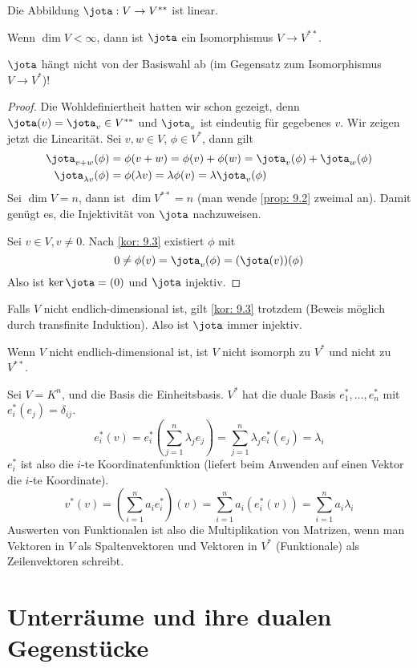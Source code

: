 \documentclass[a4paper, 10pt]{scrbook}
\begin{document}
\begin{thm}
\label{thm:9.5}
Die Abbildung $\jota: V\to V^{**}$ ist linear.

Wenn $\dim V<\infty$, dann ist $\jota$ ein Isomorphismus $V\to V^{**}$.
\begin{note}
	$\jota$ hängt nicht von der Basiswahl ab (im Gegensatz zum Isomorphismus $V\to V^*$)!
\end{note}
\begin{proof}
	Die Wohldefiniertheit hatten wir schon gezeigt, denn $\jota(v) = \jota_v \in V^{**}$ und $\jota_v$ ist eindeutig für gegebenes $v$.
	Wir zeigen jetzt die Linearität. 
	Sei $v,w\in V$, $\phi\in V^*$, dann gilt
\begin{align*}
\jota_{v+w}(\phi)&=\phi(v+w)=\phi(v)+\phi(w)=\jota_v(\phi)+\jota_w(\phi)\\
\jota_{\lambda v}(\phi) &= \phi(\lambda v) = \lambda \phi(v) = \lambda \jota_v(\phi)
\end{align*}
Sei $\dim V=n$, dann ist $\dim V^{**}=n$ (man wende \ref{prop: 9.2} zweimal an).
Damit genügt es, die Injektivität von $\jota$ nachzuweisen.

Sei $v\in V, v\neq 0$.
Nach \ref{kor: 9.3} existiert $\phi$ mit 
\[
	0 \neq \phi(v) = \jota_v(\phi) = (\jota(v))(\phi)
\]
Also ist $\ker \jota = (0)$ und $\jota$ injektiv.
\end{proof}
\begin{note}
Falls $V$ nicht endlich-dimensional ist, gilt \ref{kor: 9.3} trotzdem (Beweis möglich durch transfinite Induktion).
Also ist $\jota$ immer injektiv.

Wenn $V$ nicht endlich-dimensional ist, ist $V$ nicht isomorph zu $V^*$ und nicht zu $V^{**}$.
\end{note}
\end{thm}

Sei $V=K^n$, und die Basis die Einheitsbasis.
$V^*$ hat die duale Basis $e_1^*,\dotsc,e_n^*$ mit $e_i^*(e_j)=\delta_{ij}$.
\[
e_i^*(v)=e_i^*\left (\sum_{j=1}^n\lambda_je_j\right )=\sum_{j=1}^n\lambda_je_i^*(e_j)=\lambda_i
\]
$e_i^*$ ist also die $i$-te Koordinatenfunktion (liefert beim Anwenden auf einen Vektor die $i$-te Koordinate).
\[
	v^*(v)=\left(\sum_{i=1}^na_ie_i^*\right)(v)=\sum_{i=1}^na_i(e_i^*(v))=\sum_{i=1}^n a_i\lambda_i
\]
Auswerten von Funktionalen ist also die Multiplikation von Matrizen, wenn man
Vektoren in $V$ als Spaltenvektoren und Vektoren in $V^*$ (Funktionale) als Zeilenvektoren schreibt.

\section{Unterräume und ihre dualen Gegenstücke}
\end{document}

